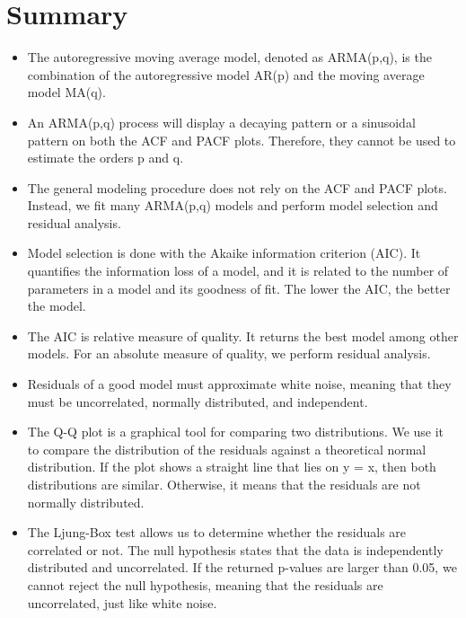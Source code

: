\section*{Summary}
\begin{itemize}
    \item The autoregressive moving average model, denoted as ARMA(p,q), is the combination of the autoregressive model AR(p) and the moving average model MA(q).
    \item An ARMA(p,q) process will display a decaying pattern or a sinusoidal pattern on both the ACF and PACF plots. Therefore, they cannot be used to estimate the orders p and q.
    \item The general modeling procedure does not rely on the ACF and PACF plots. Instead, we fit many ARMA(p,q) models and perform model selection and residual analysis.
    \item Model selection is done with the Akaike information criterion (AIC). It quantifies the information loss of a model, and it is related to the number of parameters in a model and its goodness of fit. The lower the AIC, the better the model.
    \item The AIC is relative measure of quality. It returns the best model among other models. For an absolute measure of quality, we perform residual analysis.
    \item Residuals of a good model must approximate white noise, meaning that they must be uncorrelated, normally distributed, and independent.
    \item The Q-Q plot is a graphical tool for comparing two distributions. We use it to compare the distribution of the residuals against a theoretical normal distribution. If the plot shows a straight line that lies on y = x, then both distributions are similar. Otherwise, it means that the residuals are not normally distributed.
    \item The Ljung-Box test allows us to determine whether the residuals are correlated or not. The null hypothesis states that the data is independently distributed and uncorrelated. If the returned p-values are larger than 0.05, we cannot reject the null hypothesis, meaning that the residuals are uncorrelated, just like white noise.
\end{itemize}